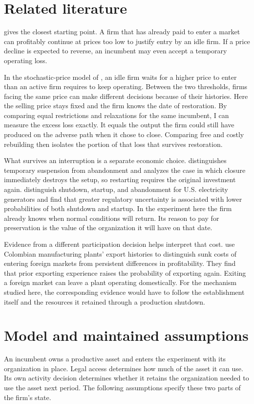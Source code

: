 \documentclass[11pt,letterpaper]{article}
\begin{document}
\clearpage
\section{Related literature}\label{sec:literature}
\citet[pp.~622--623]{dixit1989} gives the closest starting point. A firm that has already paid to enter a market can profitably continue at prices too low to justify entry by an idle firm. If a price decline is expected to reverse, an incumbent may even accept a temporary operating loss.

In the stochastic-price model of \citet[secs.~III--IV]{dixit1989}, an idle firm waits for a higher price to enter than an active firm requires to keep operating. Between the two thresholds, firms facing the same price can make different decisions because of their histories. Here the selling price stays fixed and the firm knows the date of restoration. By comparing equal restrictions and relaxations for the same incumbent, I can measure the excess loss exactly. It equals the output the firm could still have produced on the adverse path when it chose to close. Comparing free and costly rebuilding then isolates the portion of that loss that survives restoration.

What survives an interruption is a separate economic choice. \citet[pp.~119--120]{dixit1992} distinguishes temporary suspension from abandonment and analyzes the case in which closure immediately destroys the setup, so restarting requires the original investment again. \citet{fleten2017} distinguish shutdown, startup, and abandonment for U.S. electricity generators and find that greater regulatory uncertainty is associated with lower probabilities of both shutdown and startup. In the experiment here the firm already knows when normal conditions will return. Its reason to pay for preservation is the value of the organization it will have on that date.

Evidence from a different participation decision helps interpret that cost. \citet{roberts1997} use Colombian manufacturing plants' export histories to distinguish sunk costs of entering foreign markets from persistent differences in profitability. They find that prior exporting experience raises the probability of exporting again. Exiting a foreign market can leave a plant operating domestically. For the mechanism studied here, the corresponding evidence would have to follow the establishment itself and the resources it retained through a production shutdown.
\section{Model and maintained assumptions}\label{sec:model}
An incumbent owns a productive asset and enters the experiment with its organization in place. Legal access determines how much of the asset it can use. Its own activity decision determines whether it retains the organization needed to use the asset next period. The following assumptions specify these two parts of the firm's state.
\end{document}
